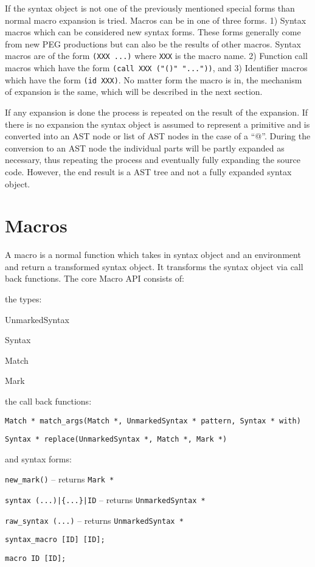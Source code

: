 \documentclass[12pt,english,letterpaper]{article}
\begin{document}
If the syntax object is not one of the previously mentioned special
forms than normal macro expansion is tried.  Macros can be in one of
three forms. 1) Syntax macros which can be considered new syntax
forms.  These forms generally come from new PEG productions but can
also be the results of other macros.  Syntax macros are of the form
\verb/(XXX ...)/ where \verb/XXX/ is the macro name.  2) Function call
macros which have the form \verb/(call XXX ("()" "..."))/, and 3)
Identifier macros which have the form \verb/(id XXX)/.  No matter form
the macro is in, the mechanism of expansion is the same, which will be
described in the next section.

If any expansion is done the process is repeated on the result of the
expansion.  If there is no expansion the syntax object is assumed to
represent a primitive and is converted into an AST node or list of AST
nodes in the case of a ``@''.  During the conversion to an AST node
the individual parts will be partly expanded as necessary, thus
repeating the process and eventually fully expanding the source code.
However, the end result is a AST tree and not a fully expanded syntax
object.

\section{Macros}

A macro is a normal function which takes in syntax object and an
environment and return a transformed syntax object.  It transforms the
syntax object via call back functions.  The core Macro API consists of:
\begin{itemize*}
\item the types:
\begin{itemize*}
\item UnmarkedSyntax
\item Syntax
\item Match
\item Mark
\end{itemize*}
\item the call back functions:
\begin{itemize*}
\item \verb/Match * match_args(Match *, UnmarkedSyntax * pattern, Syntax * with)/
\item \verb/Syntax * replace(UnmarkedSyntax *, Match *, Mark *)/
\end{itemize*}
\item and syntax forms:
\begin{itemize*}
\item \verb/new_mark()/ -- returns \verb/Mark */
\item \verb/syntax (...)|{...}|ID/ -- returns \verb/UnmarkedSyntax */
\item \verb/raw_syntax (...)/ -- returns \verb/UnmarkedSyntax */
\item \verb/syntax_macro [ID] [ID];/
\item \verb/macro ID [ID];/
\end{itemize*}
\end{itemize*}
\end{document}
